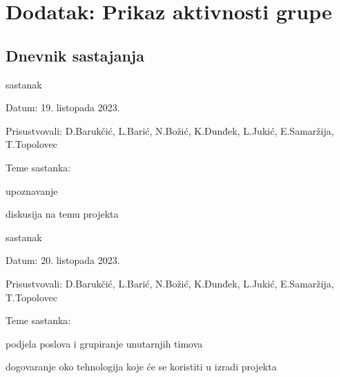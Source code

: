 \chapter*{Dodatak: Prikaz aktivnosti grupe}
		
		\section*{Dnevnik sastajanja}
		
		
		
		\begin{packed_enum}
			\item  sastanak
			
			\item[] \begin{packed_item}
				\item Datum: 19. listopada 2023.
				\item Prisustvovali: D.Barukčić, L.Barić, N.Božić, K.Đunđek, L.Jukić, E.Samaržija, T.Topolovec
				\item Teme sastanka:
				\begin{packed_item}
					\item  upoznavanje
					\item  diskusija na temu projekta 
				\end{packed_item}
			\end{packed_item}
			
			\item  sastanak
			\item[] \begin{packed_item}
				\item Datum: 20. listopada 2023.
				\item Prisustvovali: D.Barukčić, L.Barić, N.Božić, K.Đunđek, L.Jukić, E.Samaržija, T.Topolovec
				\item Teme sastanka:
				\begin{packed_item}
					\item  podjela poslova i grupiranje unutarnjih timova 
					\item  dogovaranje oko tehnologija koje će se koristiti u izradi projekta
				\end{packed_item}
			\end{packed_item}
			

\end{packed_enum}
